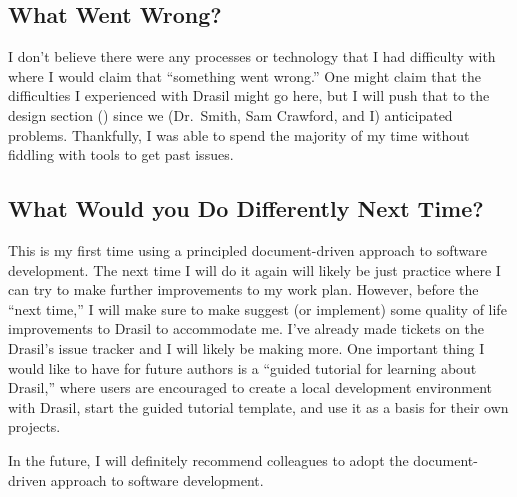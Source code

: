 \documentclass{article}
\begin{document}
\subsection{What Went Wrong?}

I don't believe there were any processes or technology that I had difficulty
with where I would claim that ``something went wrong.'' One might claim that the
difficulties I experienced with Drasil might go here, but I will push that to
the design section () since we (Dr.~Smith, Sam Crawford,
and I) anticipated problems. Thankfully, I was able to spend the majority of my
time without fiddling with tools to get past issues.

\subsection{What Would you Do Differently Next Time?}

This is my first time using a principled document-driven approach to software
development. The next time I will do it again will likely be just practice where
I can try to make further improvements to my work plan. However, before the
``next time,'' I will make sure to make suggest (or implement) some quality of
life improvements to Drasil to accommodate me. I've already made tickets on the
Drasil's issue tracker and I will likely be making more. One important thing I
would like to have for future authors is a ``guided tutorial for learning about
Drasil,'' where users are encouraged to create a local development environment
with Drasil, start the guided tutorial template, and use it as a basis for their
own projects.

In the future, I will definitely recommend colleagues to adopt the
document-driven approach to software development.
\end{document}

